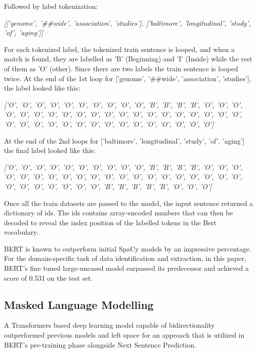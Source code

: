 \documentclass[twocolumn]{article}
\begin{document}
Followed by label tokenization: \par 
\textit{[['genome', '\#\#wide', 'association', 'studies'], ['baltimore', 'longitudinal', 'study', 'of', 'aging']]} \par 

For each tokenized label, the tokenized train sentence is looped, and when a match is found, they are labelled as 'B' (Beginning) and 'I' (Inside) while the rest of them as 'O' (other). Since there are two labels the train sentence is looped twice. At the end of the 1st loop for ['genome', '\#\#wide', 'association', 'studies'], the label looked like this: \par 

\textit{['O', 'O', 'O', 'O', 'O', 'O', 'O', 'O', 'O', 'O', 'B', 'B', 'B', 'B', 'O', 'O', 'O', 'O', 'O', 'O', 'O', 'O', 'O', 'O', 'O', 'O', 'O', 'O', 'O', 'O', 'O', 'O', 'O', 'O', 'O', 'O', 'O', 'O', 'O', 'O', 'O', 'O', 'O', 'O', 'O', 'O', 'O', 'O', 'O']} \par 

At the end of the 2nd loops for ['baltimore', 'longitudinal', 'study', 'of', 'aging'] the final label looked like this: \par 

\textit{['O', 'O', 'O', 'O', 'O', 'O', 'O', 'O', 'O', 'O', 'B', 'B', 'B', 'B', 'O', 'O', 'O', 'O', 'O', 'O', 'O', 'O', 'O', 'O', 'O', 'O', 'O', 'O', 'O', 'O', 'O', 'O', 'O', 'O', 'O', 'O', 'O', 'O', 'O', 'O', 'O', 'B', 'B', 'B', 'B', 'B', 'O', 'O', 'O']} \par 

Once all the train datasets are passed to the model, the input sentence returned a dictionary of ids. The ids contains array-encoded numbers that can then be decoded to reveal the index position of the labelled tokens in the Bert vocabulary. \par 

BERT is known to outperform initial SpaCy models by an impressive percentage. For the domain-specific task of data identification and extraction, in this paper, BERT's fine tuned large-uncased model surpassed its predecessor and achieved a score of 0.531 on the test set.

\subsection{Masked Language Modelling}
A Transformers based deep learning model capable of bidirectionality outperformed previous models and left space for an approach that is utilized in BERT's pre-training phase alongside Next Sentence Prediction. 
\end{document}
